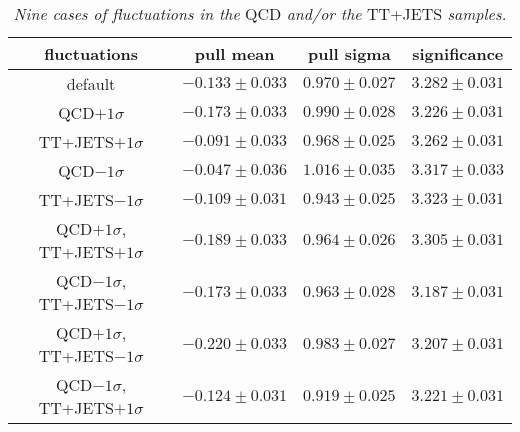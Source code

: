 \documentclass[12pt,a4paper,twoside,english]{report}
\begin{document}
\begin{table}[h!]
  \center
  \begin{tabular}{||c|c|c|c||}
    \hline
    \hline
    fluctuations                     & pull mean          & pull sigma         & significance     \\
    \hline
    default                          & $-0.133 \pm 0.033$ & $ 0.970 \pm 0.027$ & $3.282 \pm 0.031$\\
    QCD$+1\sigma$                    & $-0.173 \pm 0.033$ & $ 0.990 \pm 0.028$ & $3.226 \pm 0.031$\\
    TT+JETS$+1\sigma$                & $-0.091 \pm 0.033$ & $ 0.968 \pm 0.025$ & $3.262 \pm 0.031$\\
    QCD$-1\sigma$                    & $-0.047 \pm 0.036$ & $ 1.016 \pm 0.035$ & $3.317 \pm 0.033$\\
    TT+JETS$-1\sigma$                & $-0.109 \pm 0.031$ & $ 0.943 \pm 0.025$ & $3.323 \pm 0.031$\\
    QCD$+1\sigma$, TT+JETS$+1\sigma$ & $-0.189 \pm 0.033$ & $ 0.964 \pm 0.026$ & $3.305 \pm 0.031$\\
    QCD$-1\sigma$, TT+JETS$-1\sigma$ & $-0.173 \pm 0.033$ & $ 0.963 \pm 0.028$ & $3.187 \pm 0.031$\\
    QCD$+1\sigma$, TT+JETS$-1\sigma$ & $-0.220 \pm 0.033$ & $ 0.983 \pm 0.027$ & $3.207 \pm 0.031$\\
    QCD$-1\sigma$, TT+JETS$+1\sigma$ & $-0.124 \pm 0.031$ & $ 0.919 \pm 0.025$ & $3.221 \pm 0.031$\\
    \hline
    \hline
  \end{tabular}
  \center\caption{\footnotesize{\em Nine cases of fluctuations
   in the} QCD {\em and/or the} TT+JETS {\em samples.}}
  \label{t:bkg_fluctuations}
\end{table}
\end{document}
